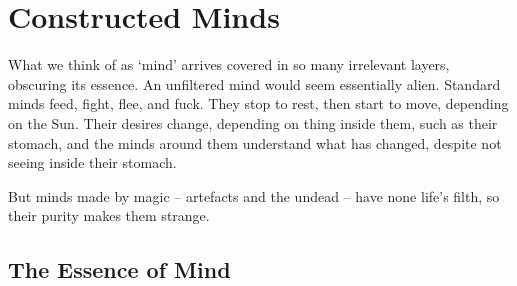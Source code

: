 \chapter{Constructed Minds}

What we think of as `mind' arrives covered in so many irrelevant layers, obscuring its essence.
An unfiltered mind would seem essentially alien.
Standard minds feed, fight, flee, and fuck.
They stop to rest, then start to move, depending on the Sun.
Their desires change, depending on thing inside them, such as their stomach, and the minds around them understand what has changed, despite not seeing inside their stomach.

But minds made by magic -- \glspl{artefact} and the undead -- have none life's filth, so their purity makes them strange.

\section{The Essence of Mind}


